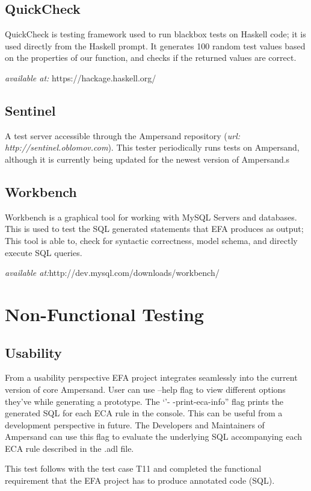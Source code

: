 \documentclass[12pt, svgnames]{article}
\begin{document}
\subsection*{QuickCheck}
QuickCheck is testing framework used to run blackbox tests on Haskell code; it 
is used directly from the Haskell prompt. It generates 100 random test values 
based on the properties of our function, and checks if the returned values are 
correct.

\textit{available at:} https://hackage.haskell.org/
\subsection*{Sentinel}
A test server accessible through the Ampersand repository (\textit{url: 
http://sentinel.oblomov.com}). This tester periodically runs tests on 
Ampersand, although it is currently being updated for the newest version of 
Ampersand.s

\subsection{Workbench}
Workbench is a graphical tool for working with MySQL Servers and databases. 
This is used to test the SQL generated statements that EFA produces as output; 
This tool is able to, check for syntactic correctness, model schema, and 
directly execute SQL queries.

\textit{available at:}http://dev.mysql.com/downloads/workbench/ 
\section{Non-Functional Testing}

\subsection{Usability}
From a usability perspective EFA project integrates seamlessly into the current version of core Ampersand. User can use --help flag to view different options they've while generating a prototype. The `'- -print-eca-info'' flag prints the generated SQL for each ECA rule in the console. This can be useful from a development perspective in future. The Developers and Maintainers of Ampersand can use this flag to evaluate the underlying SQL accompanying each ECA rule described in the .adl file.

This test follows with the test case T11 and completed the functional requirement that the EFA project has to produce annotated code (SQL).
\end{document}
